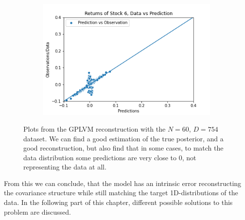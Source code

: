 \begin{figure}
\begin{subfigure}[r]{0.3\textwidth}
		\includegraphics[width=\textwidth]{img/07_0/N120/Q3_kernel5_stock6_scatter.png}
	\end{subfigure}
	\caption[Y-$\hat{Y}$ pair plots for N=120 with the GPLVM model]{Plots from the GPLVM reconstruction with the $N=60$, $D=754$ dataset. We can find a good estimation of the true posterior, and a good reconstruction, but also find that in some cases, to match the data distribution some predictions are very close to 0, not representing the data at all.}
	\label{fig:gplvm_N120_pairs}
\end{figure} 
From this we can conclude, that the model has an intrinsic error reconstructing the covariance structure while still matching the target 1D-distributions of the data. In the following part of this chapter, different possible solutions to this problem are discussed. 
